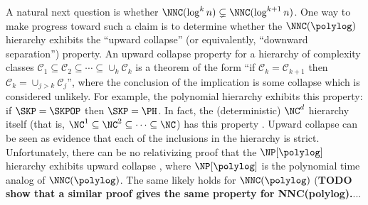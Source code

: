 \documentclass[]{article}
\begin{document}
A natural next question is whether $\NNC(\log^k n) \subsetneq \NNC(\log^{k + 1} n)$.
One way to make progress toward such a claim is to determine whether the $\NNC(\polylog)$ hierarchy exhibits the ``upward collapse'' (or equivalently, ``downward separation'') property.
An upward collapse property for a hierarchy of complexity classes $\mathcal{C}_1 \subseteq \mathcal{C}_2 \subseteq \dotsb \subseteq \cup_k \mathcal{C}_k$ is a theorem of the form ``if $\mathcal{C}_k = \mathcal{C}_{k + 1}$ then $\mathcal{C}_k = \cup_{j > k} \mathcal{C}_j$'', where the conclusion of the implication is some collapse which is considered unlikely.
For example, the polynomial hierarchy exhibits this property: if $\SKP = \SKPOP$ then $\SKP = \PH$.
In fact, the (deterministic) $\NC^d$ hierarchy itself (that is, $\NC^1 \subseteq \NC^2 \subseteq \dotsb \subseteq \NC$) has this property \cite[Corollary~5]{wilson89}.
Upward collapse can be seen as evidence that each of the inclusions in the hierarchy is strict.
Unfortunately, there can be no relativizing proof that the $\NP[\polylog]$ hierarchy exhibits upward collapse \cite{bg94}, where $\NP[\polylog]$ is the polynomial time analog of $\NNC(\polylog)$.
The same likely holds for $\NNC(\polylog)$ (\textbf{TODO show that a similar proof gives the same property for NNC(polylog).}...
\end{document}
